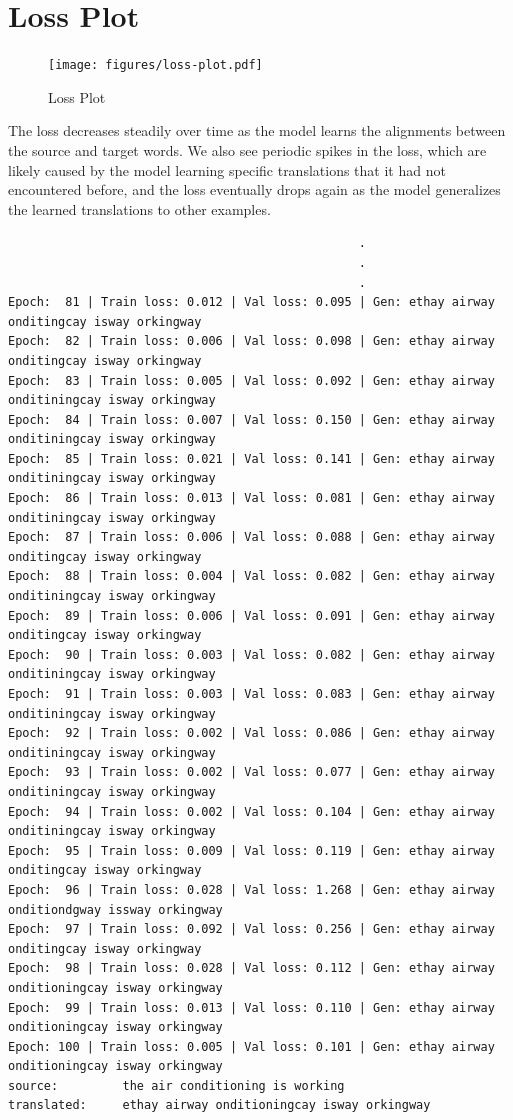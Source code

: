 \section{Loss Plot}

\begin{figure}[H]
  \centering
  \texttt{[image: figures/loss-plot.pdf]}
  \caption{Loss Plot}
  \label{fig:loss-plot}
\end{figure}

The loss decreases steadily over time as the model learns the alignments
between the source and target words.
We also see periodic spikes in the loss, which are likely caused by the
model learning specific translations that it had not encountered before,
and the loss eventually drops again as the model generalizes the 
learned translations to other examples.

\begin{small}
\begin{verbatim}
                                                 .
                                                 .
                                                 .
Epoch:  81 | Train loss: 0.012 | Val loss: 0.095 | Gen: ethay airway onditingcay isway orkingway
Epoch:  82 | Train loss: 0.006 | Val loss: 0.098 | Gen: ethay airway onditingcay isway orkingway
Epoch:  83 | Train loss: 0.005 | Val loss: 0.092 | Gen: ethay airway onditiningcay isway orkingway
Epoch:  84 | Train loss: 0.007 | Val loss: 0.150 | Gen: ethay airway onditiningcay isway orkingway
Epoch:  85 | Train loss: 0.021 | Val loss: 0.141 | Gen: ethay airway onditiningcay isway orkingway
Epoch:  86 | Train loss: 0.013 | Val loss: 0.081 | Gen: ethay airway onditiningcay isway orkingway
Epoch:  87 | Train loss: 0.006 | Val loss: 0.088 | Gen: ethay airway onditingcay isway orkingway
Epoch:  88 | Train loss: 0.004 | Val loss: 0.082 | Gen: ethay airway onditiningcay isway orkingway
Epoch:  89 | Train loss: 0.006 | Val loss: 0.091 | Gen: ethay airway onditingcay isway orkingway
Epoch:  90 | Train loss: 0.003 | Val loss: 0.082 | Gen: ethay airway onditiningcay isway orkingway
Epoch:  91 | Train loss: 0.003 | Val loss: 0.083 | Gen: ethay airway onditiningcay isway orkingway
Epoch:  92 | Train loss: 0.002 | Val loss: 0.086 | Gen: ethay airway onditiningcay isway orkingway
Epoch:  93 | Train loss: 0.002 | Val loss: 0.077 | Gen: ethay airway onditiningcay isway orkingway
Epoch:  94 | Train loss: 0.002 | Val loss: 0.104 | Gen: ethay airway onditiningcay isway orkingway
Epoch:  95 | Train loss: 0.009 | Val loss: 0.119 | Gen: ethay airway onditingcay isway orkingway
Epoch:  96 | Train loss: 0.028 | Val loss: 1.268 | Gen: ethay airway onditiondgway issway orkingway
Epoch:  97 | Train loss: 0.092 | Val loss: 0.256 | Gen: ethay airway onditingcay isway orkingway
Epoch:  98 | Train loss: 0.028 | Val loss: 0.112 | Gen: ethay airway onditioningcay isway orkingway
Epoch:  99 | Train loss: 0.013 | Val loss: 0.110 | Gen: ethay airway onditioningcay isway orkingway
Epoch: 100 | Train loss: 0.005 | Val loss: 0.101 | Gen: ethay airway onditioningcay isway orkingway
source:         the air conditioning is working
translated:     ethay airway onditioningcay isway orkingway
\end{verbatim}
\end{small}

